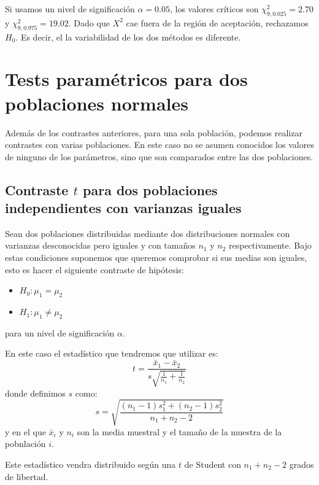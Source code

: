 \documentclass[a4paper,12pt]{article}
\begin{document}
    Si usamos un nivel de significación $\alpha = 0.05$, los valores críticos son $\chi^2_{9, 0.025} = 2.70$ y $\chi^2_{9,0.975} = 19.02$. 
    Dado que $X^2$ cae fuera de la región de aceptación, rechazamos $H_0$.
    Es decir, el la variabilidad de los dos métodos es diferente.


\section{Tests paramétricos para dos poblaciones normales}

    Además de los contrastes anteriores, para una sola población, podemos realizar contrastes con varias poblaciones.
    En este caso no se asumen conocidos los valores de ninguno de los parámetros, sino que son comparados entre las dos poblaciones.

\subsection{Contraste $t$ para dos poblaciones independientes con varianzas iguales}
\label{sec:t_2samplessamevar}

    Sean dos poblaciones distribuidas mediante dos distribuciones normales con varianzas desconocidas pero iguales y con tamaños $n_1$ y $n_2$ respectivamente.
    Bajo estas condiciones suponemos que queremos comprobar si sus medias son iguales, esto es hacer el siguiente contraste de hipótesis:
\begin{itemize}
	\item $H_0:\mu_1=\mu_2$
	\item $H_1:\mu_1\neq \mu_2$
\end{itemize}
para un nivel de significación $\alpha$.

En este caso el estadístico que tendremos que utilizar es: 
\begin{equation}
    t
    =
    \frac{\bar{x}_1-\bar{x}_2}{s\sqrt{\frac{1}{n_1}+\frac{1}{n_2}}}
\end{equation}
donde definimos $s$ como:
\begin{equation}
    s=\sqrt{\frac{(n_1-1)s_1^2+(n_2-1)s_2^2}{n_1+n_2-2}}
\end{equation}
y en el que $\bar{x}_i$ y $n_i$ son la media muestral y el tamaño de la muestra de la pobnlación $i$.

Este estadístico vendra distribuido según una $t$ de Student con $n_1 + n_2 - 2$ grados de libertad.
\end{document}
